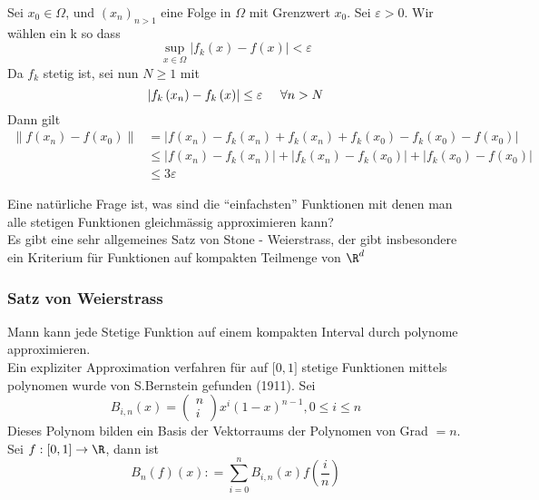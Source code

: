 \begin{beweis}{4.31}
Sei $x_0\in\Omega$, und $\left( x_n\right)_{n>1}$ eine Folge in $\Omega$ mit Grenzwert $x_0$. Sei $\varepsilon>0$. Wir wählen ein k so dass 
\[\mathop {\sup }\limits_{x \in \Omega } \left| {{f_k}(x) - f(x)} \right| < \varepsilon \]
Da $f_k$ stetig ist, sei nun $N\geq 1$ mit 
\[\left| {{f_k}\left( {{x_n}} \right) - {f_k}\left( x \right)} \right| \le \varepsilon \hspace{5mm}\forall n > N\]
Dann gilt 
\begin{align*}
\left\| {f\left( {{x_n}} \right) - f\left( {{x_0}} \right)} \right\| &= \left| {f\left( {{x_n}} \right) - {f_k}\left( {{x_n}} \right) + {f_k}\left( {{x_n}} \right) + {f_k}\left( {{x_0}} \right) - {f_k}\left( {{x_0}} \right) - f\left( {{x_0}} \right)} \right|\\
 &\le \left| {f\left( {{x_n}} \right) - {f_k}\left( {{x_n}} \right)} \right| + \left| {{f_k}\left( {{x_n}} \right) - {f_k}\left( {{x_0}} \right)} \right| + \left| {{f_k}\left( {{x_0}} \right) - f\left( {{x_0}} \right)} \right|\\
 &\le 3\varepsilon 
\end{align*}
\end{beweis}
Eine natürliche Frage ist, was sind die ``einfachsten'' Funktionen mit denen man alle stetigen Funktionen gleichmässig approximieren kann?\\
Es gibt eine sehr allgemeines Satz von Stone - Weierstrass, der gibt insbesondere ein Kriterium für Funktionen auf kompakten Teilmenge von $\R^d$
\subsubsection*{Satz von Weierstrass}
Mann kann jede Stetige Funktion auf einem kompakten Interval durch polynome approximieren. \\

Ein expliziter Approximation verfahren für auf $\lbrack 0,1\rbrack$ stetige Funktionen mittels polynomen wurde von S.Bernstein gefunden (1911). Sei 
\[{B_{i,n}}(x) = \left( {\begin{array}{*{20}{c}}
n\\
i
\end{array}} \right){x^i}{\left( {1 - x} \right)^{n - 1}},0 \le i \le n\]
Dieses Polynom bilden ein Basis der Vektorraums der Polynomen von Grad $=n$. Sei $f:\lbrack 0,1\rbrack\to\R$, dann ist
\[{B_n}\left( f \right)(x): = \sum\limits_{i = 0}^n {{B_{i,n}}\left( x \right)f\left( {\frac{i}{n}} \right)} \]
